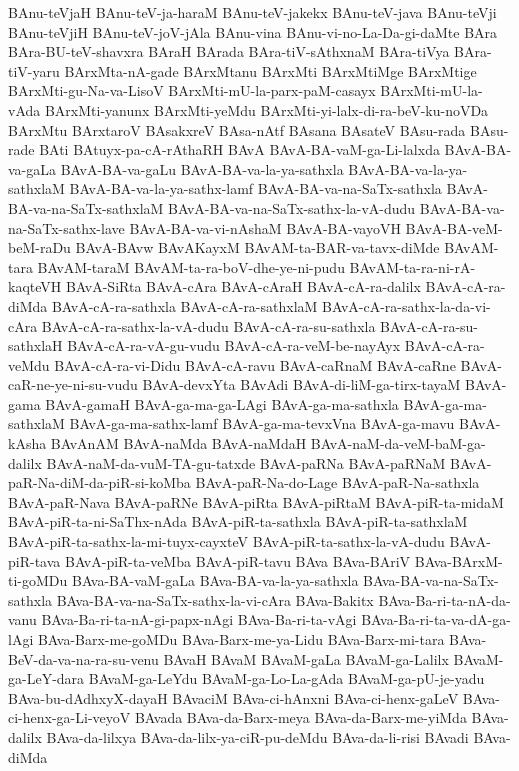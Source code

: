 {BAnu-teVjaH
BAnu-teV-ja-haraM
BAnu-teV-jakekx
BAnu-teV-java
BAnu-teVji
BAnu-teVjiH
BAnu-teV-joV-jAla
BAnu-vina
BAnu-vi-no-La-Da-gi-daMte
BAra
BAra-BU-teV-shavxra
BAraH
BArada
BAra-tiV-sAthxnaM
BAra-tiVya
BAra-tiV-yaru
BArxMta-nA-gade
BArxMtanu
BArxMti
BArxMtiMge
BArxMtige
BArxMti-gu-Na-va-LisoV
BArxMti-mU-la-parx-paM-casayx
BArxMti-mU-la-vAda
BArxMti-yanunx
BArxMti-yeMdu
BArxMti-yi-lalx-di-ra-beV-ku-noVDa
BArxMtu
BArxtaroV
BAsakxreV
BAsa-nAtf
BAsana
BAsateV
BAsu-rada
BAsu-rade
BAti
BAtuyx-pa-cA-rAthaRH
BAvA
BAvA-BA-vaM-ga-Li-lalxda
BAvA-BA-va-gaLa
BAvA-BA-va-gaLu
BAvA-BA-va-la-ya-sathxla
BAvA-BA-va-la-ya-sathxlaM
BAvA-BA-va-la-ya-sathx-lamf
BAvA-BA-va-na-SaTx-sathxla
BAvA-BA-va-na-SaTx-sathxlaM
BAvA-BA-va-na-SaTx-sathx-la-vA-dudu
BAvA-BA-va-na-SaTx-sathx-lave
BAvA-BA-va-vi-nAshaM
BAvA-BA-vayoVH
BAvA-BA-veM-beM-raDu
BAvA-BAvw
BAvAKayxM
BAvAM-ta-BAR-va-tavx-diMde
BAvAM-tara
BAvAM-taraM
BAvAM-ta-ra-boV-dhe-ye-ni-pudu
BAvAM-ta-ra-ni-rA-kaqteVH
BAvA-SiRta
BAvA-cAra
BAvA-cAraH
BAvA-cA-ra-dalilx
BAvA-cA-ra-diMda
BAvA-cA-ra-sathxla
BAvA-cA-ra-sathxlaM
BAvA-cA-ra-sathx-la-da-vi-cAra
BAvA-cA-ra-sathx-la-vA-dudu
BAvA-cA-ra-su-sathxla
BAvA-cA-ra-su-sathxlaH
BAvA-cA-ra-vA-gu-vudu
BAvA-cA-ra-veM-be-nayAyx
BAvA-cA-ra-veMdu
BAvA-cA-ra-vi-Didu
BAvA-cA-ravu
BAvA-caRnaM
BAvA-caRne
BAvA-caR-ne-ye-ni-su-vudu
BAvA-devxYta
BAvAdi
BAvA-di-liM-ga-tirx-tayaM
BAvA-gama
BAvA-gamaH
BAvA-ga-ma-ga-LAgi
BAvA-ga-ma-sathxla
BAvA-ga-ma-sathxlaM
BAvA-ga-ma-sathx-lamf
BAvA-ga-ma-tevxVna
BAvA-ga-mavu
BAvA-kAsha
BAvAnAM
BAvA-naMda
BAvA-naMdaH
BAvA-naM-da-veM-baM-ga-dalilx
BAvA-naM-da-vuM-TA-gu-tatxde
BAvA-paRNa
BAvA-paRNaM
BAvA-paR-Na-diM-da-piR-si-koMba
BAvA-paR-Na-do-Lage
BAvA-paR-Na-sathxla
BAvA-paR-Nava
BAvA-paRNe
BAvA-piRta
BAvA-piRtaM
BAvA-piR-ta-midaM
BAvA-piR-ta-ni-SaThx-nAda
BAvA-piR-ta-sathxla
BAvA-piR-ta-sathxlaM
BAvA-piR-ta-sathx-la-mi-tuyx-cayxteV
BAvA-piR-ta-sathx-la-vA-dudu
BAvA-piR-tava
BAvA-piR-ta-veMba
BAvA-piR-tavu
BAva
BAva-BAriV
BAva-BArxM-ti-goMDu
BAva-BA-vaM-gaLa
BAva-BA-va-la-ya-sathxla
BAva-BA-va-na-SaTx-sathxla
BAva-BA-va-na-SaTx-sathx-la-vi-cAra
BAva-Bakitx
BAva-Ba-ri-ta-nA-da-vanu
BAva-Ba-ri-ta-nA-gi-papx-nAgi
BAva-Ba-ri-ta-vAgi
BAva-Ba-ri-ta-va-dA-ga-lAgi
BAva-Barx-me-goMDu
BAva-Barx-me-ya-Lidu
BAva-Barx-mi-tara
BAva-BeV-da-va-na-ra-su-venu
BAvaH
BAvaM
BAvaM-gaLa
BAvaM-ga-Lalilx
BAvaM-ga-LeY-dara
BAvaM-ga-LeYdu
BAvaM-ga-Lo-La-gAda
BAvaM-ga-pU-je-yadu
BAva-bu-dAdhxyX-dayaH
BAvaciM
BAva-ci-hAnxni
BAva-ci-henx-gaLeV
BAva-ci-henx-ga-Li-veyoV
BAvada
BAva-da-Barx-meya
BAva-da-Barx-me-yiMda
BAva-dalilx
BAva-da-lilxya
BAva-da-lilx-ya-ciR-pu-deMdu
BAva-da-li-risi
BAvadi
BAva-diMda
}
